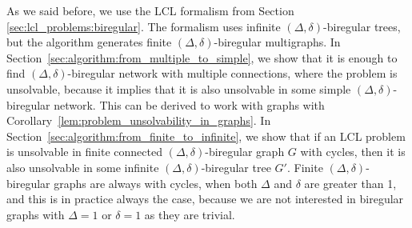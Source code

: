 As we said before, we use the LCL formalism from Section \ref{sec:lcl_problems:biregular}.
The formalism uses infinite $(\Delta, \delta)$-biregular trees, but the algorithm generates finite $(\Delta, \delta)$-biregular multigraphs.
In Section~\ref{sec:algorithm:from_multiple_to_simple}, we show that it is enough to find $(\Delta, \delta)$-biregular network with multiple connections, where the problem is unsolvable, because it implies that it is also unsolvable in some simple $(\Delta, \delta)$-biregular network.
This can be derived to work with graphs with Corollary~\ref{lem:problem_unsolvability_in_graphs}.
In Section~\ref{sec:algorithm:from_finite_to_infinite}, we show that if an LCL problem is unsolvable in finite connected $(\Delta, \delta)$-biregular graph $G$ with cycles, then it is also unsolvable in some infinite $(\Delta, \delta)$-biregular tree $G'$.
Finite $(\Delta, \delta)$-biregular graphs are always with cycles, when both $\Delta$ and $\delta$ are greater than 1, and this is in practice always the case, because we are not interested in biregular graphs with $\Delta=1$ or $\delta=1$ as they are trivial.



